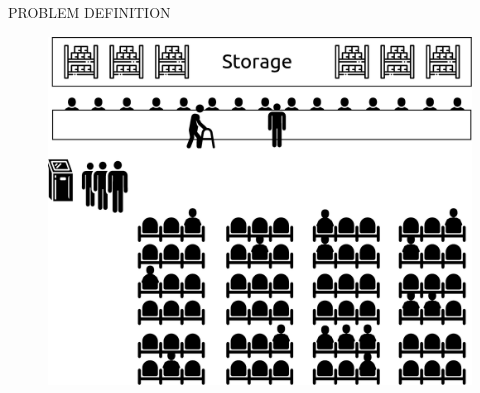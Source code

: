 \begin{frame}{PROBLEM DEFINITION}
    \begin{figure}
        \centering
        \includegraphics[scale=.4]{images/drawing.pdf}
    \end{figure}
\end{frame}